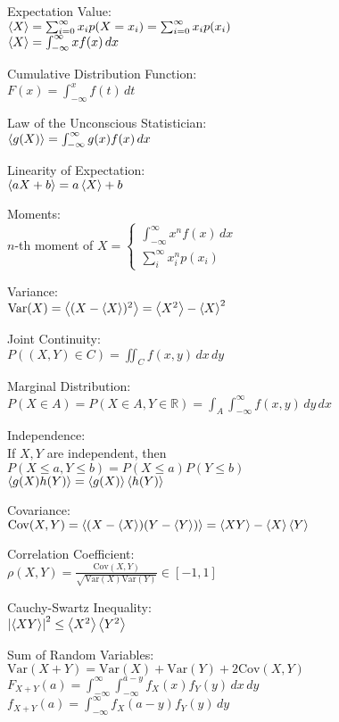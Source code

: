 \documentclass[12pt,landscape]{article}
\newcommand{\tab}{\hspace*{1em}}
\newcommand{\ds}{\displaystyle}
\newcommand{\Var}[1]{\mathrm{Var}(#1)}
\newcommand{\Cov}[1]{\mathrm{Cov}(#1)}
\theoremstyle{definition}
\begin{document}
\begin{multicols}{3}
Expectation Value:\\
\tab $\expval{X} = \sum_{i=0}^{\infty} x_i p(X = x_i) = \sum_{i=0}^{\infty} x_i p(x_i)$\\
\tab $\expval{X} = \int_{-\infty}^\infty xf(x)\,dx$

Cumulative Distribution Function:\\
\tab $F(x) = \int_{-\infty}^{x} f(t)\,dt$

Law of the Unconscious Statistician:\\
\tab $\expval{g(X)} = \int_{-\infty}^{\infty}g(x)f(x)\,dx$

Linearity of Expectation:\\
\tab $\expval{aX+b} = a\expval{X} + b$

Moments:\\
\tab $n$-th moment of $X = \begin{cases}
\int_{-\infty}^{\infty}x^n f(x)\,dx & \,\\
\sum_{i}^{\infty} x_i^n p(x_i) & \,
\end{cases}$

Variance:\\
\tab $\Var{X} = \expval{(X-\expval{X})^2} = \expval{X^2} - \expval{X}^2$

Joint Continuity:\\
\tab $P((X,Y)\in C) = \iint_C f(x,y)\,dx\,dy$

Marginal Distribution:\\
\tab $P(X\in A) = P(X \in A, Y \in \mathbb{R}) = \int_A \int_{-\infty}^{\infty}f(x,y)\,dy\,dx$

Independence:\\
If $X,Y$ are independent, then\\
\tab $P(X\leq a, Y\leq b) = P(X\leq a)P(Y\leq b)$\\
\tab $\expval{g(X)h(Y)} = \expval{g(X)}\expval{h(Y)}$

Covariance:\\
\tab $\Cov{X,Y} = \expval{(X-\expval{X})(Y-\expval{Y})} = \expval{XY} - \expval{X}\expval{Y}$

Correlation Coefficient:\\
\tab $\ds \rho(X,Y) = \frac{\Cov{X,Y}}{\sqrt{\Var{X}\Var{Y}}} \in [-1,1]$

Cauchy-Swartz Inequality:\\
\tab $\abs{\expval{XY}}^2 \leq \expval{X^2}\expval{Y^2}$

Sum of Random Variables:\\
\tab $\Var{X+Y} = \Var{X} + \Var{Y} + 2\Cov{X,Y}$\\
\tab $\ds F_{X+Y}(a)=\int_{-\infty}^\infty\int_{-\infty}^{a-y}f_X(x)f_Y(y)\,dx\,dy$\\
\tab $\ds f_{X+Y}(a)=\int_{-\infty}^\infty f_X(a-y)f_Y(y)\,dy$\\


\end{multicols}
\end{document}
